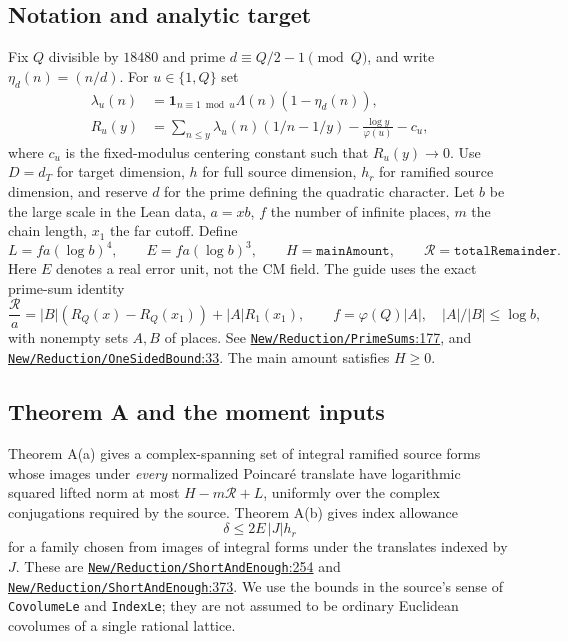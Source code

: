 \documentclass[11pt]{article}
\theoremstyle{remark}\newtheorem{remark}[theorem]{Remark}
\newcommand{\R}{\mathcal R}
\newcommand{\src}[2]{\href{https://github.com/lsernau/grh-lean/blob/72fead102f663d5c7a407964a13dc0cf9d977207/grh/src/#1.lean\#L#2}{\nolinkurl{#1}:#2}}
\begin{document}
\subsection{Notation and analytic target}
Fix $Q$ divisible by $18480$ and prime $d\equiv Q/2-1\pmod Q$, and write $\eta_d(n)=(n/d)$. For $u\in\{1,Q\}$ set
\begin{align*}
\lambda_u(n)&=\mathbf 1_{n\equiv1\bmod u}\Lambda(n)(1-\eta_d(n)),\\
R_u(y)&=\sum_{n\le y}\lambda_u(n)(1/n-1/y)-\frac{\log y}{\varphi(u)}-c_u,
\end{align*}
where $c_u$ is the fixed-modulus centering constant such that $R_u(y)\to0$. Use $D=d_T$ for target dimension, $h$ for full source dimension, $h_r$ for ramified source dimension, and reserve $d$ for the prime defining the quadratic character. Let $b$ be the large scale in the Lean data, $a=xb$, $f$ the number of infinite places, $m$ the chain length, $x_1$ the far cutoff. Define
\[
L=fa(\log b)^4,\qquad E=fa(\log b)^3,\qquad H=\texttt{mainAmount},\qquad \R=\texttt{totalRemainder}.
\]
Here $E$ denotes a real error unit, not the CM field. The guide uses the exact prime-sum identity
\begin{equation}\label{eq:primeidentity}
\frac{\R}{a}=|B|(R_Q(x)-R_Q(x_1))+|A|R_1(x_1),\qquad
f=\varphi(Q)|A|,\quad |A|/|B|\le\log b,
\end{equation}
with nonempty sets $A,B$ of places. See \src{New/Reduction/PrimeSums}{177}, and \src{New/Reduction/OneSidedBound}{33}. The main amount satisfies $H\ge0$.

\subsection{Theorem A and the moment inputs}
Theorem A(a) gives a complex-spanning set of integral ramified source forms whose images under \emph{every} normalized Poincar\'e translate have logarithmic squared lifted norm at most $H-m\R+L$, uniformly over the complex conjugations required by the source. Theorem A(b) gives index allowance
\begin{equation}\label{eq:index}
\delta\le 2 E\,|J|h_r
\end{equation}
for a family chosen from images of integral forms under the translates indexed by $J$. These are \src{New/Reduction/ShortAndEnough}{254} and \src{New/Reduction/ShortAndEnough}{373}. We use the bounds in the source's sense of \texttt{CovolumeLe} and \texttt{IndexLe}; they are not assumed to be ordinary Euclidean covolumes of a single rational lattice.
\end{document}
